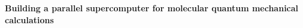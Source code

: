 
\setlength{\textwidth}{7in}
\setlength{\textheight}{9.0in}
\setlength{\oddsidemargin}{-.25in}
%
\setlength{\topmargin}{-.10in}
\def\Real{\rm I\hspace{-0.2em}R}
\def\nin{{\in \! \! \! \! \! /} \,}
\def\nequiv{{\equiv \! \! \! \! \! \! /} \,}

\newcommand{\half}{\mbox{$\frac{1}{2}$}}
\newcommand{\mul}{\multicolumn{2}{c}{none}}
\newcommand{\qua}{\mbox{$\frac{1}{4}$}}
\newcommand{\six}{\mbox{$\frac{1}{6}$}}
\newcommand{\tfour}{\mbox{$\frac{1}{24}$}}
\newcommand{\beq}{\begin{equation}}
\newcommand{\eeq}{\end{equation}}
\newcommand{\tripler}{T_{3}\!\left(^{a^{\prime}b^{\prime}
{\rm C}^{\prime}}_{{\rm I}^{\prime}j^{\prime}k^{\prime}}\right)}
\newcommand{\quadrupler}{T_{4}\!\left(^{a^{\prime}b^{\prime}
{\rm C}^{\prime}{\rm D}^{\prime}}_{{\rm I}^{\prime}{\rm J}^{\prime}
k^{\prime}l^{\prime}}\right)}






\setlength{\baselineskip}{1em}


\noindent
{\bf Building a parallel supercomputer for molecular
quantum mechanical calculations}




